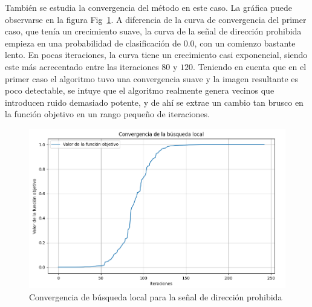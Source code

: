 También se estudia la convergencia del método en este caso. La gráfica puede observarse en la figura Fig~\ref{fig:evol2}. A diferencia de la curva de convergencia del primer caso, que tenía un crecimiento suave, la curva de la señal de dirección prohibida empieza en una probabilidad de clasificación de $0.0$, con un comienzo bastante lento. En pocas iteraciones, la curva tiene un crecimiento casi exponencial, siendo este más acrecentado entre las iteraciones $80$ y $120$. Teniendo en cuenta que en el primer caso el algoritmo tuvo una convergencia suave y la imagen resultante es poco detectable, se intuye que el algoritmo realmente genera vecinos que introducen ruido demasiado potente, y de ahí se extrae un cambio tan brusco en la función objetivo en un rango pequeño de iteraciones.

\begin{figure}[H]
    \centering
        \centering
        \includegraphics[width=\textwidth]{img/evolucion_dir_prohib_bl.png}
        \caption{Convergencia de búsqueda local para la señal de dirección prohibida}
        \label{fig:evol2}
\end{figure}




